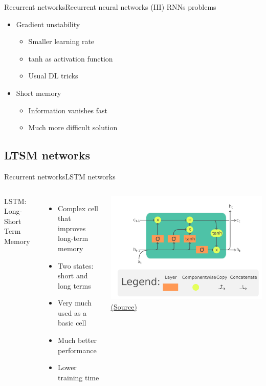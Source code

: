 \documentclass[10pt,compress]{beamer} %
\begin{document}
\begin{frame}{Recurrent networks}{Recurrent neural networks (III)}
    RNNs problems
    \begin{itemize}
        \item Gradient unstability
            \begin{itemize}
            \item Smaller learning rate
            \item tanh as activation function
            \item Usual DL tricks
            \end{itemize}
        \item Short memory
            \begin{itemize}
            \item Information vanishes fast
            \item Much more difficult solution
            \end{itemize}
    \end{itemize}
\end{frame}

\subsection{LTSM networks}
\begin{frame}{Recurrent networks}{LSTM networks}
    \begin{columns}
            LSTM: Long-Short Term Memory
            \begin{itemize}
                \item Complex cell that improves long-term memory
                \item Two states: short and long terms
                \item Very much used as a basic cell
                \item Much better performance
                \item Lower training time
            \end{itemize}
            \centering \includegraphics[width=\textwidth]{figs/LTSM.png}\\
	        \scriptsize\href{https://en.wikipedia.org/wiki/Long_short-term_memory}{(Source)}
    \end{columns}
\end{frame}
\end{document}
